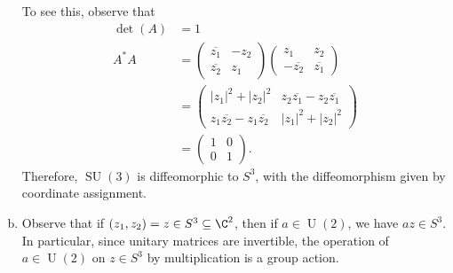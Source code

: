 \documentclass[10pt]{mypackage}
\begin{document}
\begin{solution}
\begin{enumerate}[(a)]
      To see this, observe that
      \begin{align*}
        \det\left( A \right) &= 1\\
        A^{\ast}A &= \begin{pmatrix} \overline{z_1} & -z_2\\ \overline{z_2} & z_1\end{pmatrix} \begin{pmatrix}z_1 & z_2 \\ - \overline{z_2} & \overline{z_1}\end{pmatrix}\\
                  &= \begin{pmatrix}\left\vert z_1 \right\vert^2 + \left\vert z_2 \right\vert^2 & z_2 \overline{z_1} - z_2 \overline{z_1}\\ z_1 \overline{z_2} - z_1 \overline{z_2} & \left\vert z_1 \right\vert^2 + \left\vert z_2 \right\vert^2\end{pmatrix}\\
                  &= \begin{pmatrix}1 & 0 \\ 0 & 1\end{pmatrix}.
      \end{align*}
      Therefore, $\operatorname{SU}(3)$ is diffeomorphic to $S^{3}$, with the diffeomorphism given by coordinate assignment.
    \item Observe that if $\left( z_1,z_2 \right) = z\in S^{3}\subseteq \C^{2}$, then if $a\in \operatorname{U}(2)$, we have $az\in S^{3}$. In particular, since unitary matrices are invertible, the operation of $a\in \operatorname{U}(2)$ on $z\in S^{3}$ by multiplication is a group action.
  \end{enumerate}
\end{solution}
\end{document}
